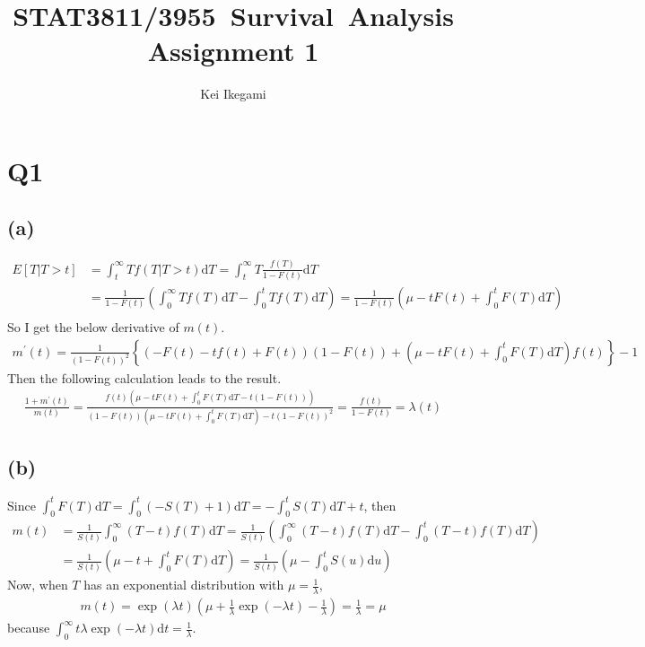 \documentclass{article}
\begin{document}
\title{STAT3811/3955\ Survival\ Analysis\\ Assignment 1}
\author{Kei Ikegami}
\maketitle

\section{Q1}
\subsection{(a)}
\begin{align*}
	E[T | T > t] &= \int_{t}^{\infty} T f(T|T > t) \mathrm{d}T = \int_{t}^{\infty} T \frac{f(T)}{1-F(t)} \mathrm{d}T\\
	&= \frac{1}{1 - F(t)} \left( \int_{0}^{\infty} T f(T) \mathrm{d}T - \int_0^t T f(T) \mathrm{d}T \right) = \frac{1}{1 - F(t)} \left( \mu - t F(t) + \int_0^t F(T) \mathrm{d}T \right) \\
\end{align*}
So I get the below derivative of $m(t)$.
\begin{align*}
	m^{'}(t) = \frac{1}{(1 - F(t))^2} \left\{ \left( -F(t) - tf(t) + F(t) \right)(1 - F(t)) + (\mu - tF(t) + \int_0^t F(T) \mathrm{d}T) f(t) \right\} -1
\end{align*} 
Then the following calculation leads to the result.
\begin{align*}
	\frac{1 + m^{'}(t)}{m(t)} = \frac{f(t)\left(\mu - tF(t) + \int_0^t F(T) \mathrm{d}T - t(1- F(t)) \right)}{(1-F(t)) \left(\mu - tF(t) + \int_0^t F(T) \mathrm{d}T \right) - t(1 - F(t))^2} = \frac{f(t)}{1-F(t)} = \lambda(t)
\end{align*}

\subsection{(b)}
Since $\int_0^t F(T) \mathrm{d}T = \int_0^t (-S(T) + 1) \mathrm{d}T = -\int_0^t S(T) \mathrm{d}T + t$, then
\begin{align*}
	m(t) &= \frac{1}{S(t)} \int_0^{\infty} (T - t) f(T) \mathrm{d}T = \frac{1}{S(t)} \left( \int_{0}^{\infty} (T-t) f(T) \mathrm{d}T - \int_0^t (T-t) f(T) \mathrm{d}T \right)\\
	&= \frac{1}{S(t)} \left( \mu - t + \int_0^t F(T) \mathrm{d}T \right) = \frac{1}{S(t)} \left( \mu - \int_0^t S(u) \mathrm{d}u \right)
\end{align*}
Now, when $T$ has an exponential distribution with $\mu = \frac{1}{\lambda}$,
\begin{align*}
	m(t) = \exp(\lambda t) \left( \mu + \frac{1}{\lambda} \exp(-\lambda t) - \frac{1}{\lambda} \right) = \frac{1}{\lambda} = \mu
\end{align*}
because $\int_0^{\infty} t \lambda \exp(-\lambda t) \mathrm{d} t = \frac{1}{\lambda}$.
\end{document}
